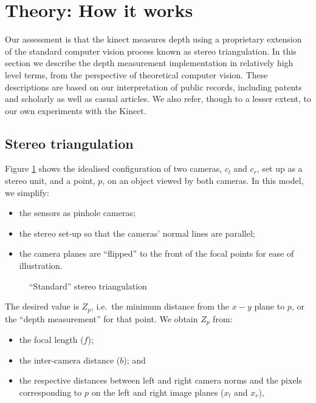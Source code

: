 \section{Theory: How it works}
\label{howitworks}

Our assessment is that the kinect measures depth using a proprietary extension
of the standard computer vision process known as stereo triangulation. In this
section we describe the depth measurement implementation in relatively high
level terms, from the perspective of theoretical computer vision. These
descriptions are based on our interpretation of public records, including
patents and scholarly as well as casual articles. We also refer, though to a
lesser extent, to our own experiments with the Kinect.


\subsection{Stereo triangulation}
\label{sub:triang}

Figure \ref{fig:triang} shows the idealised configuration of two cameras,
$c_{l}$ and $c_{r}$, set up as a stereo unit, and a point, $p$, on an object
viewed by both cameras. In this model, we simplify: 
\begin{itemize}

    \item   the sensors as pinhole cameras;

    \item   the stereo set-up so that the cameras' normal lines are parallel;

    \item   the camera planes are ``flipped'' to the front of the focal points
    for ease of illustration.

\end{itemize}

\begin{figure}[ht]
    \begin{center}
        
        \caption{``Standard'' stereo triangulation}
        \label{fig:triang}
    \end{center}
\end{figure}

The desired value is $Z_{p}$, i.e.\ the minimum distance from the $x-y$ plane to
$p$, or the ``depth measurement'' for that point. We obtain $Z_{p}$ from: 
\begin{itemize}

    \item the focal length ($f$);

    \item the inter-camera distance ($b$); and 

    \item the respective distances between left and right camera norms and the
    pixels corresponding to $p$ on the left and right image planes ($x_{l}$ and
    $x_{r}$),

\end{itemize}

